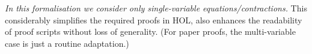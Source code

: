 
\emph{In this
formalisation we consider only single-variable equations/contractions.}
This considerably
 simplifies the required proofs in HOL, also enhances the readability of
 proof scripts without loss of generality. (For paper proofs, the
 multi-variable case is just a routine adaptation.)





